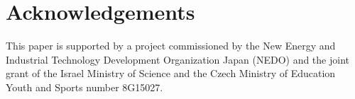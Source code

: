 \documentclass[letterpaper]{article}
\begin{document}
\section{Acknowledgements}
This paper is supported by a project commissioned by the New Energy and Industrial Technology Development Organization Japan (NEDO) and the joint grant of the Israel Ministry of Science and the Czech Ministry of Education Youth and Sports number 8G15027.



\end{document}

